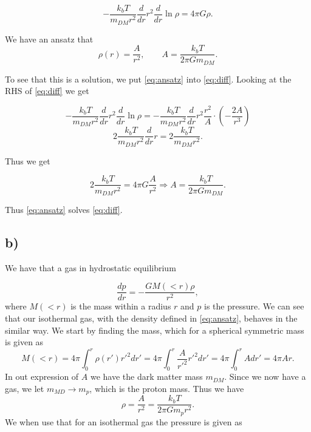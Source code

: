 \documentclass[a4paper,norsk, 10pt]{article}
\begin{document}
\begin{equation}\label{eq:diff}
-\dfrac{k_b T}{m_{DM} r^2}\dfrac{d}{dr}r^2 \dfrac{d}{dr} \ln \rho = 4 \pi G\rho.
\end{equation}

We have an ansatz that
\begin{equation}\label{eq:ansatz}
\rho(r) = \dfrac{A}{r^2}, \qquad A = \frac{k_b T}{2\pi Gm_{DM}}.
\end{equation}

To see that this is a solution, we put \eqref{eq:ansatz} into \eqref{eq:diff}. Looking at the RHS of \eqref{eq:diff} we get 


\begin{equation}
-\dfrac{k_b T}{m_{DM} r^2}\dfrac{d}{dr}r^2 \dfrac{d}{dr} \ln \rho = -\dfrac{k_b T}{m_{DM} r^2}\dfrac{d}{dr}r^2 \dfrac{r^2}{A}\cdot \left(-\dfrac{2A}{r^3}\right)
\end{equation}
\begin{equation}
2\dfrac{k_b T}{m_{DM} r^2}\dfrac{d}{dr}r = 2\dfrac{k_b T}{m_{DM} r^2}.
\end{equation}

Thus we get

\begin{equation}
2\dfrac{k_b T}{m_{DM} r^2} = 4\pi G \dfrac{A}{r^2} \Rightarrow A = \dfrac{k_b T}{2\pi G m_{DM} }.
\end{equation}

Thus \eqref{eq:ansatz} solves \eqref{eq:diff}.


\subsection{b)}

We have that a gas in hydrostatic equilibrium 

\begin{equation}\label{eq:dp}
\dfrac{dp}{dr} = - \dfrac{GM(<r)\rho}{r^2},
\end{equation}
where $M(<r)$ is the mass within a radius $r$ and $p$ is the pressure. We can see that our isothermal gas, with the density defined in \eqref{eq:ansatz}, behaves in the similar way. We start by finding the mass, which for a spherical symmetric mass is given as
\begin{equation}\label{eq:mass}
M(<r) = 4\pi \int_0^r \rho(r') r'^2 dr' = 4\pi \int_0^r \dfrac{A}{r'^2} r'^2 dr' = 4\pi \int_0^r A  dr' = 4\pi A r.
\end{equation}
In out expression of $A$ we have the dark matter mass $m_{DM}$. Since we now have a gas, we let $m_{MD} \rightarrow m_p$, which is the proton mass. Thus we have
\begin{equation}
\rho = \dfrac{A}{r^2} = \dfrac{k_b T}{2\pi G m_p r^2}.
\end{equation}
We when use that for an isothermal gas the pressure is given as
\end{document}
